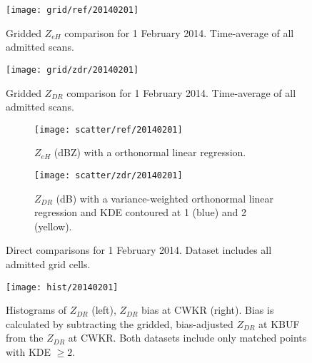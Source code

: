\begin{figure}[H]
\texttt{[image: grid/ref/20140201]}
\caption{Gridded $Z_{eH}$ comparison for 1 February 2014. Time-average of all admitted scans.} 
\label{fig:grid_ref_20140201}
\end{figure}

\begin{figure}[H]
\texttt{[image: grid/zdr/20140201]}
\caption{Gridded $Z_{DR}$ comparison for 1 February 2014. Time-average of all admitted scans.} 
\label{fig:grid_zdr_20140201}
\end{figure}

\begin{figure}[H]
\centering
   \begin{subfigure}[t]{0.48\linewidth} \centering
     \texttt{[image: scatter/ref/20140201]}
     \caption{$Z_{eH}$ (dBZ) with a orthonormal linear regression.}\label{fig:scatter_ref_20140201}
   \end{subfigure}
   \begin{subfigure}[t]{0.48\linewidth} \centering
     \texttt{[image: scatter/zdr/20140201]}
     \caption{$Z_{DR}$ (dB) with a variance-weighted orthonormal linear regression and KDE contoured at 1 (blue) and 2 (yellow).}\label{fig:scatter_zdr_20140201}
   \end{subfigure}
\caption{Direct comparisons for 1 February 2014. Dataset includes all admitted grid cells.} \label{fig:scatter_20140201}
\end{figure}

\begin{figure}[H]
\texttt{[image: hist/20140201]}\centering
\caption{Histograms of $Z_{DR}$ (left), $Z_{DR}$ bias at CWKR (right). Bias is calculated by subtracting the gridded, bias-adjusted $Z_{DR}$ at KBUF from the
$Z_{DR}$ at CWKR. Both datasets include only matched points with KDE $\geq 2$.} 
\label{fig:hist_20140201}
\end{figure}

